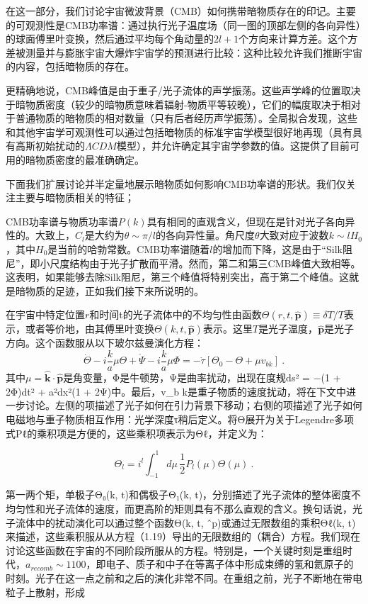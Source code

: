 
在这一部分，我们讨论宇宙微波背景（CMB）如何携带暗物质存在的印记。主要的可观测性是CMB功率谱：通过执行光子温度场（同一图的顶部左侧的各向异性）的球面傅里叶变换，然后通过平均每个角动量的$2l+1$个方向来计算方差。这个方差被测量并与膨胀宇宙大爆炸宇宙学的预测进行比较：这种比较允许我们推断宇宙的内容，包括暗物质的存在。

更精确地说，CMB峰值是由于重子/光子流体的声学振荡。这些声学峰的位置取决于暗物质密度（较少的暗物质意味着辐射-物质平等较晚），它们的幅度取决于相对于普通物质的暗物质的相对数量（只有后者经历声学振荡）。全局拟合发现，这些和其他宇宙学可观测性可以通过包括暗物质的标准宇宙学模型很好地再现（具有具有高斯初始扰动的$\Lambda CDM$模型），并允许确定其宇宙学参数的值。这提供了目前可用的暗物质密度的最准确确定。

下面我们扩展讨论并半定量地展示暗物质如何影响CMB功率谱的形状。我们仅关注主要与暗物质相关的特征； 

CMB功率谱与物质功率谱$P(k)$具有相同的直观含义，但现在是针对光子各向异性的。大致上，$C_l$是大约为$\theta \sim \pi /l$的各向异性量。角尺度$\theta$大致对应于波数$k \sim l H_0$，其中$H_0$是当前的哈勃常数。CMB功率谱随着$l$的增加而下降，这是由于“Silk阻尼”，即小尺度结构由于光子扩散而平滑。然而，第二和第三CMB峰值大致相等。这表明，如果能够去除Silk阻尼，第三个峰值将特别突出，高于第二个峰值。这就是暗物质的足迹，正如我们接下来所说明的。

在宇宙中特定位置$r$和时间t的光子流体中的不均匀性由函数$\Theta(r, t, \hat{\mathbf{p}}) \equiv \delta T/T$表示，或者等价地，由其傅里叶变换$\Theta(k, t, \hat{\mathbf{p}})$表示。这里$T$是光子温度，$\hat{\mathbf{p}}$是光子方向。这个函数服从以下玻尔兹曼演化方程：
\[ \dot{\Theta} - i \frac{k}{a}\mu  \Theta + \dot{\Psi} - i \frac{k}{a} \mu  \Phi = - \dot{\tau}[\Theta_0 - \Theta + \mu v_{b k}]~. \]
其中$\mu = \hat{\mathbf{k}} \cdot \hat{\mathbf{p}}$是角变量，Φ是牛顿势，Ψ是曲率扰动，出现在度规ds² = −(1 + 2Φ)dt² + a²dx²(1 + 2Ψ)中。最后，v_b k是重子物质的速度扰动，将在下文中进一步讨论。左侧的项描述了光子如何在引力背景下移动；右侧的项描述了光子如何电磁地与重子物质相互作用：光学深度τ稍后定义。将Θ展开为关于Legendre多项式Pℓ的乘积项是方便的，这些乘积项表示为Θℓ，并定义为：

\[ \Theta_l = i^l\int_{-1}^{1} d\mu \, \frac{1}{2} P_l(\mu) \Theta(\mu)~. \]

第一两个矩，单极子Θ₀(k, t)和偶极子Θ₁(k, t)，分别描述了光子流体的整体密度不均匀性和光子流体的速度，而更高阶的矩则具有不那么直观的含义。换句话说，光子流体中的扰动演化可以通过整个函数Θ(k, t, ˆp)或通过无限数组的乘积Θℓ(k, t)来描述，这些乘积服从从方程（1.19）导出的无限数组的（耦合）方程。我们现在讨论这些函数在宇宙的不同阶段所服从的方程。特别是，一个关键时刻是重组时代，$a_{recomb} \sim 1100$，即电子、质子和中子在等离子体中形成束缚的氢和氦原子的时刻。光子在这一点之前和之后的演化非常不同。在重组之前，光子不断地在带电粒子上散射，形成


